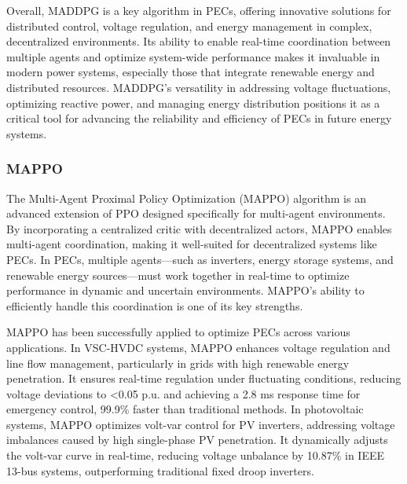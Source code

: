 
Overall, MADDPG is a key algorithm in PECs, offering innovative solutions for distributed control, voltage regulation, and energy management in complex, decentralized environments. Its ability to enable real-time coordination between multiple agents and optimize system-wide performance makes it invaluable in modern power systems, especially those that integrate renewable energy and distributed resources. MADDPG's versatility in addressing voltage fluctuations, optimizing reactive power, and managing energy distribution positions it as a critical tool for advancing the reliability and efficiency of PECs in future energy systems.

\subsubsection{MAPPO}

The Multi-Agent Proximal Policy Optimization (MAPPO) algorithm is an advanced extension of PPO designed specifically for multi-agent environments. By incorporating a centralized critic with decentralized actors, MAPPO enables multi-agent coordination, making it well-suited for decentralized systems like PECs. In PECs, multiple agents—such as inverters, energy storage systems, and renewable energy sources—must work together in real-time to optimize performance in dynamic and uncertain environments. MAPPO's ability to efficiently handle this coordination is one of its key strengths.

MAPPO has been successfully applied to optimize PECs across various applications. In VSC-HVDC systems, MAPPO enhances voltage regulation and line flow management, particularly in grids with high renewable energy penetration. It ensures real-time regulation under fluctuating conditions, reducing voltage deviations to <0.05 p.u. and achieving a 2.8 ms response time for emergency control, 99.9\% faster than traditional methods. In photovoltaic systems, MAPPO optimizes volt-var control for PV inverters, addressing voltage imbalances caused by high single-phase PV penetration. It dynamically adjusts the volt-var curve in real-time, reducing voltage unbalance by 10.87\% in IEEE 13-bus systems, outperforming traditional fixed droop inverters.

